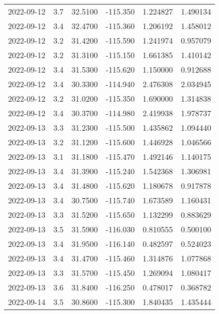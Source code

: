 \begin{tabular}{lrrrrr}
2022-09-12 &       3.7 &  32.5100 &  -115.350 &         1.224827 &         1.490134 \\
2022-09-12 &       3.4 &  32.4700 &  -115.360 &         1.206192 &         1.458012 \\
2022-09-12 &       3.2 &  31.4200 &  -115.590 &         1.241974 &         0.957079 \\
2022-09-12 &       3.2 &  31.3100 &  -115.150 &         1.661385 &         1.410142 \\
2022-09-12 &       3.4 &  31.5300 &  -115.620 &         1.150000 &         0.912688 \\
2022-09-12 &       3.4 &  30.3300 &  -114.940 &         2.476308 &         2.034945 \\
2022-09-12 &       3.2 &  31.0200 &  -115.350 &         1.690000 &         1.314838 \\
2022-09-12 &       3.4 &  30.3700 &  -114.980 &         2.419938 &         1.978737 \\
2022-09-13 &       3.3 &  31.2300 &  -115.500 &         1.435862 &         1.094440 \\
2022-09-13 &       3.2 &  31.1200 &  -115.600 &         1.446928 &         1.046566 \\
2022-09-13 &       3.1 &  31.1800 &  -115.470 &         1.492146 &         1.140175 \\
2022-09-13 &       3.4 &  31.3900 &  -115.240 &         1.542368 &         1.306981 \\
2022-09-13 &       3.4 &  31.4800 &  -115.620 &         1.180678 &         0.917878 \\
2022-09-13 &       3.4 &  30.7500 &  -115.740 &         1.673589 &         1.160431 \\
2022-09-13 &       3.3 &  31.5200 &  -115.650 &         1.132299 &         0.883629 \\
2022-09-13 &       3.5 &  31.5900 &  -116.030 &         0.810555 &         0.500100 \\
2022-09-13 &       3.4 &  31.9500 &  -116.140 &         0.482597 &         0.524023 \\
2022-09-13 &       3.4 &  31.4700 &  -115.460 &         1.314876 &         1.077868 \\
2022-09-13 &       3.3 &  31.5700 &  -115.450 &         1.269094 &         1.080417 \\
2022-09-13 &       3.6 &  31.8400 &  -116.250 &         0.478017 &         0.368782 \\
2022-09-14 &       3.5 &  30.8600 &  -115.300 &         1.840435 &         1.435444 \\

\end{tabular}
